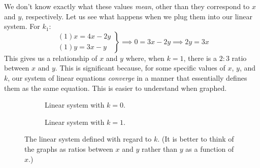 We don't know exactly what these values \textit{mean}, other than they correspond to $x$ and $y$, respectively.
Let us see what happens when we plug them into our linear system.
For $k_1$:
\begin{equation*}
	\left. \begin{array}{l}
		(1)x = 4x - 2y \\
		(1)y = 3x - y
	\end{array} \right \}
	\implies 0 = 3x - 2y \implies 2y = 3x
\end{equation*}
This gives us a relationship of $x$ and $y$ where, when $k = 1$, there is a 
$2 : 3$ ratio between $x$ and $y$.
This is significant because, for some specific values of $x$, $y$, and $k$, our system of linear equations \textit{converge} in a manner that essentially defines them as the same equation.
This is easier to understand when graphed.
\begin{figure}[h!]
	\centering
	\captionsetup[subfigure]{justification=centering}
	\begin{subfigure}[b]{0.4\textwidth}
		\centering
		\caption{\small Linear system with $k = 0$.}
		\label{fig:sample-eigens0}
	\end{subfigure}
	\qquad
	\begin{subfigure}[b]{0.4\textwidth}
		\centering
		\caption{\small Linear system with $k = 1$.}
		\label{fig:sample-eigens1}
	\end{subfigure}
	\caption{The linear system defined with regard to $k$. (It is better to think of the graphs as ratios between $x$ and $y$ rather than $y$ as a function of $x$.)}
	\label{fig:sample-eigens}
\end{figure}
